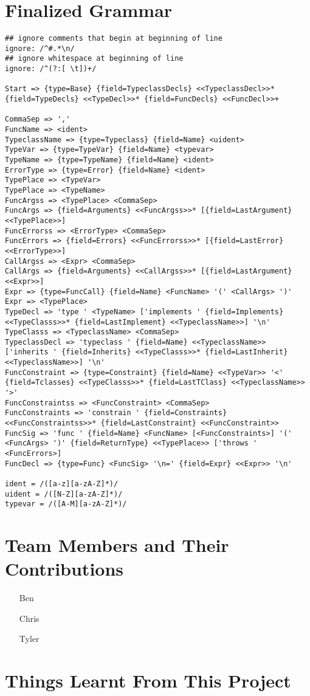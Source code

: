 \documentclass{acm_proc_article-sp}
\begin{document}
\section{Finalized Grammar}
	\begin{lstlisting}
## ignore comments that begin at beginning of line
ignore: /^#.*\n/
## ignore whitespace at beginning of line
ignore: /^(?:[ \t])+/

Start => {type=Base} {field=TypeclassDecls} <<TypeclassDecl>>* {field=TypeDecls} <<TypeDecl>>* {field=FuncDecls} <<FuncDecl>>+

CommaSep => ','
FuncName => <ident>
TypeclassName => {type=Typeclass} {field=Name} <uident>
TypeVar => {type=TypeVar} {field=Name} <typevar>
TypeName => {type=TypeName} {field=Name} <ident>
ErrorType => {type=Error} {field=Name} <ident>
TypePlace => <TypeVar>
TypePlace => <TypeName>
FuncArgss => <TypePlace> <CommaSep>
FuncArgs => {field=Arguments} <<FuncArgss>>* [{field=LastArgument} <<TypePlace>>]
FuncErrorss => <ErrorType> <CommaSep>
FuncErrors => {field=Errors} <<FuncErrorss>>* [{field=LastError} <<ErrorType>>]
CallArgss => <Expr> <CommaSep>
CallArgs => {field=Arguments} <<CallArgss>>* [{field=LastArgument} <<Expr>>]
Expr => {type=FuncCall} {field=Name} <FuncName> '(' <CallArgs> ')'
Expr => <TypePlace>
TypeDecl => 'type ' <TypeName> ['implements ' {field=Implements} <<TypeClasss>>* {field=LastImplement} <<TypeclassName>>] '\n'
TypeClasss => <TypeclassName> <CommaSep>
TypeclassDecl => 'typeclass ' {field=Name} <<TypeclassName>> ['inherits ' {field=Inherits} <<TypeClasss>>* {field=LastInherit} <<TypeclassName>>] '\n'
FuncConstraint => {type=Constraint} {field=Name} <<TypeVar>> '<' {field=Tclasses} <<TypeClasss>>* {field=LastTClass} <<TypeclassName>> '>'
FuncConstraintss => <FuncConstraint> <CommaSep>
FuncConstraints => 'constrain ' {field=Constraints} <<FuncConstraintss>>* {field=LastConstraint} <<FuncConstraint>>
FuncSig => 'func ' {field=Name} <FuncName> [<FuncConstraints>] '(' <FuncArgs> ')' {field=ReturnType} <<TypePlace>> ['throws ' <FuncErrors>]
FuncDecl => {type=Func} <FuncSig> '\n=' {field=Expr} <<Expr>> '\n'

ident = /([a-z][a-zA-Z]*)/
uident = /([N-Z][a-zA-Z]*)/
typevar = /([A-M][a-zA-Z]*)/
	\end{lstlisting}

\section{Team Members and Their Contributions}
	\begin{itemize}
		\item[Ben]
		\item[Chris]
		\item[Tyler]
	\end{itemize}
\section{Things Learnt From This Project}
\end{document}
